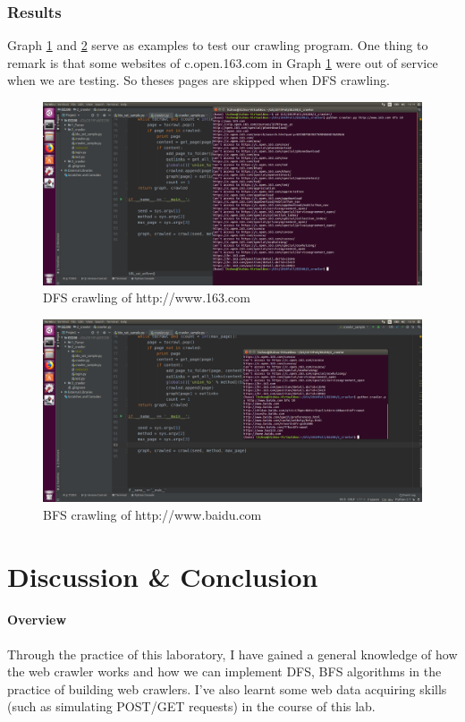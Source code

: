 \documentclass{article}
\begin{document}
\subsubsection{Results}

Graph \ref{img:3.1} and \ref{img:3.2} serve as examples to test our crawling program. One thing to remark is that some websites of c.open.163.com in Graph \ref{img:3.1} were out of service when we are testing. So theses pages are skipped when DFS crawling.

\begin{figure}[htbp]
\centering
\includegraphics[width=13.5cm]{img/test3_1.png}
\caption{DFS crawling of http://www.163.com}
\label{img:3.1}
\end{figure}

\begin{figure}[htbp]
\centering
\includegraphics[width=13.5cm]{img/test3_2.png}
\caption{BFS crawling of http://www.baidu.com}
\label{img:3.2}
\end{figure}

\section{Discussion \& Conclusion}
\paragraph{Overview}
Through the practice of this laboratory, I have gained a general knowledge of how the web crawler works and how we can implement DFS, BFS algorithms in the practice of building web crawlers. I've also learnt some web data acquiring skills (such as simulating POST/GET requests) in the course of this lab.
\end{document}
